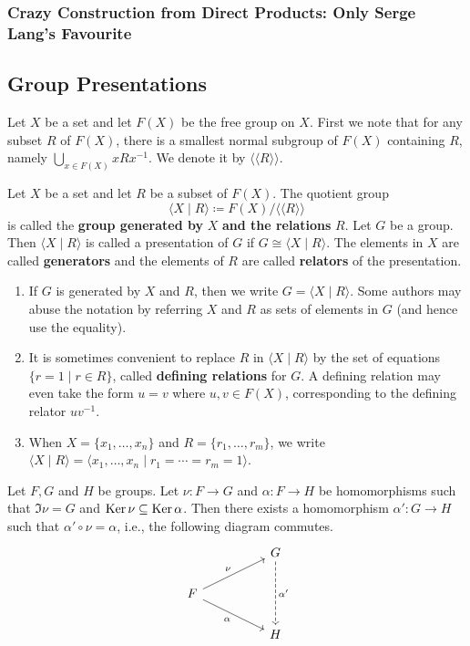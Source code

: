 \subsubsection{Crazy Construction from Direct Products: Only Serge Lang's Favourite}
\subsection{Group Presentations} \label{sec-group-presentations}
Let $X$ be a set and let $F(X)$ be the free group on $X$. First we note that for any subset $R$ of $F(X)$, there is a smallest normal subgroup of $F(X)$ containing $R$, namely $\bigcup_{x\in F(X)} xRx^{-1}$. We denote it by $\langle\langle R\rangle\rangle$.
\begin{definition}
	Let $X$ be a set and let $R$ be a subset of $F(X)$. The quotient group $$\langle X\mid R\rangle\coloneq F(X)/\langle\langle R\rangle\rangle$$ is called the \textbf{group generated by} $X$ \textbf{and the relations} $R$.  Let $G$ be a group. Then $\langle X\mid R\rangle$ is called a presentation of $G$ if $G\cong\langle X\mid R\rangle$. The elements in $X$ are called \textbf{generators} and the elements of $R$ are called \textbf{relators} of the presentation.
\end{definition} 
\begin{remark}
	\begin{enumerate}[(1)]
		\item If $G$ is generated by $X$ and $R$, then we write $G = \langle X\mid R\rangle$. Some authors may abuse the notation by referring $X$ and $R$ as sets of elements in $G$ (and hence use the equality).
		\item It is sometimes convenient to replace $R$ in $\langle X\mid R\rangle$ by the set of equations $\{r=1\mid r\in R\}$, called \textbf{defining relations} for $G$. A defining relation may even take the form
		$u=v$ where $u,v\in F(X)$, corresponding to the defining relator $uv^{-1}$.
		\item When $X=\{x_1,\dots, x_n\}$ and $R = \{r_1,\dots, r_m\}$, we write $\langle X\mid R\rangle = \langle x_1,\dots, x_n \mid r_1=\cdots = r_m=1 \rangle$.
	\end{enumerate}
\end{remark}
\begin{lemma} \label{lemma-for-von-Dyck}
	Let $F,G$ and $H$ be groups. Let $\nu :F\to G$ and $\alpha:F\to H$ be homomorphisms such that $\Im \nu = G$ and $\operatorname{Ker} \nu \subseteq \operatorname{Ker} \alpha$. Then there exists a homomorphism $\alpha':G\to H$ such that $ \alpha'\circ \nu = \alpha$, i.e., the following diagram commutes.
	\[\begin{tikzcd}
		&& G \\
		F \\
		&& H
		\arrow["{\alpha'}", dashed, from=1-3, to=3-3]
		\arrow["\nu", from=2-1, to=1-3]
		\arrow["\alpha"', from=2-1, to=3-3]
	\end{tikzcd}\]
\end{lemma}

